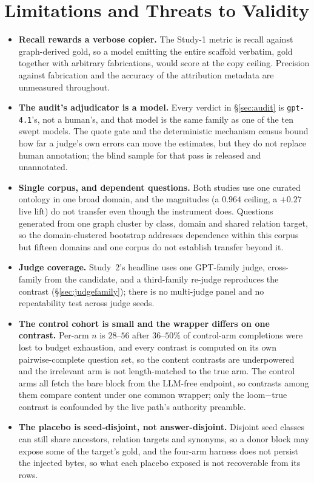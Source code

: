 \documentclass[10pt,twocolumn]{article}
\begin{document}
\section{Limitations and Threats to Validity}\label{sec:limits}
\begin{itemize}[topsep=2pt,itemsep=2pt,leftmargin=1.4em]
\item \textbf{Recall rewards a verbose copier.} The Study-1 metric is recall against graph-derived gold, so a model emitting the entire scaffold verbatim, gold together with arbitrary fabrications, would score at the copy ceiling. Precision against fabrication and the accuracy of the attribution metadata are unmeasured throughout.
\item \textbf{The audit's adjudicator is a model.} Every verdict in \S\ref{sec:audit} is \texttt{gpt-4.1}'s, not a human's, and that model is the same family as one of the ten swept models. The quote gate and the deterministic mechanism census bound how far a judge's own errors can move the estimates, but they do not replace human annotation; the blind sample for that pass is released and unannotated.
\item \textbf{Single corpus, and dependent questions.} Both studies use one curated ontology in one broad domain, and the magnitudes (a $0.964$ ceiling, a $+0.27$ live lift) do not transfer even though the instrument does. Questions generated from one graph cluster by class, domain and shared relation target, so the domain-clustered bootstrap addresses dependence within this corpus but fifteen domains and one corpus do not establish transfer beyond it.
\item \textbf{Judge coverage.} Study~2's headline uses one GPT-family judge, cross-family from the candidate, and a third-family re-judge reproduces the contrast (\S\ref{sec:judgefamily}); there is no multi-judge panel and no repeatability test across judge seeds.
\item \textbf{The control cohort is small and the wrapper differs on one contrast.} Per-arm $n$ is $28$--$56$ after $36$--$50\%$ of control-arm completions were lost to budget exhaustion, and every contrast is computed on its own pairwise-complete question set, so the content contrasts are underpowered and the irrelevant arm is not length-matched to the true arm. The control arms all fetch the bare block from the LLM-free endpoint, so contrasts among them compare content under one common wrapper; only the loom$-$true contrast is confounded by the live path's authority preamble.
\item \textbf{The placebo is seed-disjoint, not answer-disjoint.} Disjoint seed classes can still share ancestors, relation targets and synonyms, so a donor block may expose some of the target's gold, and the four-arm harness does not persist the injected bytes, so what each placebo exposed is not recoverable from its rows.

\end{itemize}
\end{document}
